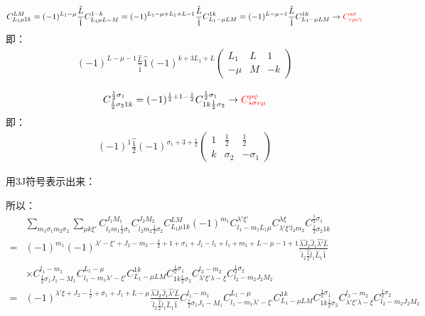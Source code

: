 \documentclass[a4paper]{article}
\newcommand{\no}{\nonumber}
\newcommand{\red}{\color{red}}
\begin{document}
\begin{align}
C_{L_{1}\mu 1k}^{LM}=(-1)^{L_{1}-\mu}\frac{\hat{L}}{\hat{1}}C_{L_{1}\mu L-M}^{1-k}=(-1)^{L_{1}-\mu+L_{1}+L-1}\frac{\hat{L}}{\hat{1}}C_{L_{1}-\mu LM}^{1k}=(-1)^{L-\mu-1}\frac{\hat{L}}{\hat{1}}C_{L_{1}-\mu LM}^{1k}\rightarrow{\red C_{r\rho c\gamma}^{s\sigma}}
\end{align}
即：
\begin{align}
(-1)^{L-\mu-1}\frac{\hat{L}}{\hat{1}}\hat{1}(-1)^{k+3L_{1}+L}\left(\begin{array}{ccc}L_{1}&L&1\\-\mu&M&-k\end{array}\right)
\end{align}

\begin{align}
C_{\frac{1}{2}\sigma_{2}1k}^{\frac{1}{2}\sigma_{1}}=(-1)^{\frac{1}{2}+1-\frac{1}{2}}C_{1k\frac{1}{2}\sigma_{2}}^{\frac{1}{2}\sigma_{1}}\rightarrow{\red C_{s\sigma v\mu}^{p\psi}}
\end{align}
即：
\begin{align}
(-1)^{1}\hat{\frac{1}{2}}(-1)^{\sigma_{1}+3+\frac{1}{2}}\left(\begin{array}{ccc}1&\frac{1}{2}&\frac{1}{2}\\k&\sigma_{2}&-\sigma_{1}\end{array}\right)
\end{align}

用3J符号表示出来：

所以：
\begin{align}
\no&\sum_{m_{1}\sigma_{1}m_{2}\sigma_{2}}\sum_{\mu k\xi'}C_{l_{1}m_{1}\frac{1}{2}\sigma_{1}}^{J_{1}M_{1}}C_{l_{2}m_{2}\frac{1}{2}\sigma_{2}}^{J_{2}M_{2}}C_{L_{1}\mu1k}^{LM}(-1)^{m_{1}}C_{l_{1}-m_{1}L_{1}\mu}^{\lambda'\xi'}C_{\lambda'\xi'l_{2}m_{2}}^{\lambda\xi}C_{\frac{1}{2}\sigma_{2}1k}^{\frac{1}{2}\sigma_{1}}\\
\no=&(-1)^{m_{1}}(-1)^{\lambda'-\xi'+J_{2}-m_{2}-\frac{1}{2}+1+\sigma_{1}+J_{1}-l_{1}+l_{1}+m_{1}+L-\mu-1+1}\frac{\hat{\lambda}\hat{J}_{2}\hat{J}_{1}\hat{\lambda'}\hat{L}}{\hat{l}_{2}\hat{\frac{1}{2}}\hat{l}_{1}\hat{L}_{1}\hat{1}}\\
\no&\times C_{\frac{1}{2}\sigma_{1}J_{1}-M_{1}}^{l_{1}-m_{1}}C_{l_{1}-m_{1}\lambda'-\xi'}^{L_{1}-\mu}C_{L_{1}-\mu LM}^{1k}C_{1k\frac{1}{2}\sigma_{2}}^{\frac{1}{2}\sigma_{1}}C_{\lambda'\xi'\lambda-\xi}^{l_{2}-m_{2}}C_{l_{2}-m_{2}J_{2}M_{2}}^{\frac{1}{2}\sigma_{2}}\\
=&(-1)^{\lambda'\xi+J_{2}-\frac{1}{2}+\sigma_{1}+J_{1}+L-\mu}\frac{\hat{\lambda}\hat{J}_{2}\hat{J}_{1}\hat{\lambda'}\hat{L}}{\hat{l}_{2}\hat{\frac{1}{2}}\hat{l}_{1}\hat{L}_{1}\hat{1}} C_{\frac{1}{2}\sigma_{1}J_{1}-M_{1}}^{l_{1}-m_{1}}C_{l_{1}-m_{1}\lambda'-\xi'}^{L_{1}-\mu}C_{L_{1}-\mu LM}^{1k}C_{1k\frac{1}{2}\sigma_{2}}^{\frac{1}{2}\sigma_{1}}C_{\lambda'\xi'\lambda-\xi}^{l_{2}-m_{2}}C_{l_{2}-m_{2}J_{2}M_{2}}^{\frac{1}{2}\sigma_{2}}
\end{align}
\end{document}
